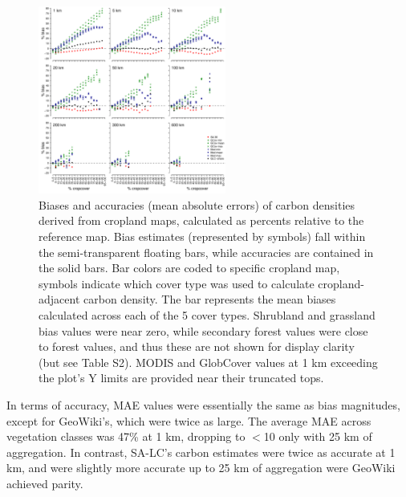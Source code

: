 \documentclass[a4paper]{article}
\begin{document}
\begin{figure}[!h]
\centerline{\includegraphics[width=0.55\textwidth]{figures/figure3.pdf}}
\caption{Biases and accuracies (mean absolute errors) of carbon densities derived from cropland maps, calculated as percents relative to the reference map. Bias estimates (represented by symbols) fall within the semi-transparent floating bars, while accuracies are contained in the solid bars. Bar colors are coded to specific cropland map, symbols indicate which cover type was used to calculate cropland-adjacent carbon density. The bar represents the mean biases calculated across each of the 5 cover types. Shrubland and grassland bias values were near zero, while secondary forest values were close to forest values, and thus these are not shown for display clarity (but see Table S2). MODIS and GlobCover values at 1 km exceeding the plot's Y limits are provided near their truncated tops.}
\label{afoto}
\end{figure}

In terms of accuracy, MAE values were essentially the same as bias magnitudes, except for GeoWiki's, which were twice as large. The average MAE across vegetation classes was 47\% at 1 km, dropping to $<$10 only with 25 km of aggregation. In contrast, SA-LC's carbon estimates were twice as accurate at 1 km, and were slightly more accurate up to 25 km of aggregation were GeoWiki achieved parity.  

\vspace{-0.3 cm}
\end{document}

